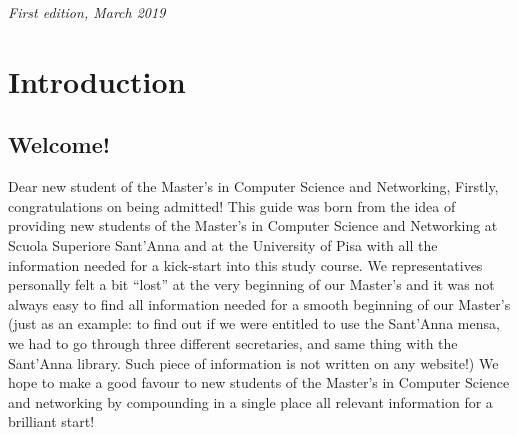 \documentclass[11pt,fleqn,oneside]{book} %
\begin{document}
\noindent \textit{First edition, March 2019} %




\pagestyle{empty} %

\tableofcontents %

\cleardoublepage %

\pagestyle{fancy} %



\chapter{Introduction}


\section{Welcome!}

Dear new student of the Master’s in Computer Science and Networking,
Firstly, congratulations on being admitted!  This guide was born from the idea of providing new students of the Master’s in Computer Science and Networking at Scuola Superiore Sant’Anna and at the University of Pisa with all the information needed for a kick-start into this study course. We representatives personally felt a bit “lost” at the very beginning of our Master’s and it was not always easy to find all information needed for a smooth beginning of our Master’s (just as an example: to find out if we were entitled to use the Sant’Anna mensa, we had to go through three different secretaries, and same thing with the Sant’Anna library. Such piece of information is not written on any website!) 
We hope to make a good favour to new students of the Master’s in Computer Science and networking by compounding in a single place all relevant information for a brilliant start!
\end{document}
